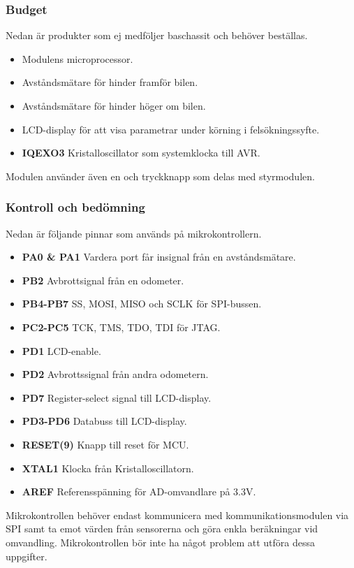\documentclass[designspec/spec.tex]{subfiles}
\begin{document}
\subsubsection{Budget}
Nedan är produkter som ej medföljer baschassit och behöver beställas.
\begin{itemize}
	\item \textbf{\modMicrocontroller} Modulens microprocessor. 
    \item \textbf{\modDistf} Avståndsmätare för hinder framför bilen.
    \item \textbf{\modDists} Avståndsmätare för hinder höger om bilen.
    \item \textbf{\modLcd} LCD-display för att visa parametrar under körning
    i felsökningssyfte.
    \item \textbf{IQEXO3} Kristalloscillator som systemklocka till AVR.
\end{itemize}
Modulen använder även en {\modJtag} och tryckknapp som delas med styrmodulen.

\subsubsection{Kontroll och bedömning}
Nedan är följande pinnar som används på mikrokontrollern.
\begin{itemize}
   \item \textbf{PA0 \& PA1} Vardera port får insignal från en avståndsmätare.
   \item \textbf{PB2} Avbrottsignal från en odometer.
   \item \textbf{PB4-PB7} SS, MOSI, MISO och SCLK för SPI-bussen.
   \item \textbf{PC2-PC5} TCK, TMS, TDO, TDI för JTAG.
   \item \textbf{PD1} LCD-enable.
   \item \textbf{PD2} Avbrottssignal från andra odometern.
   \item \textbf{PD7} Register-select signal till LCD-display.
   \item \textbf{PD3-PD6} Databuss till LCD-display.
   \item \textbf{RESET(9)} Knapp till reset för MCU.
   \item \textbf{XTAL1} Klocka från Kristalloscillatorn. 
   \item \textbf{AREF} Referensspänning för AD-omvandlare på 3.3V.

\end{itemize}
Mikrokontrollen behöver endast kommunicera med kommunikationsmodulen via SPI
samt ta emot värden från sensorerna och göra enkla beräkningar vid omvandling.
Mikrokontrollen bör inte ha något problem att utföra dessa uppgifter.
\end{document}
